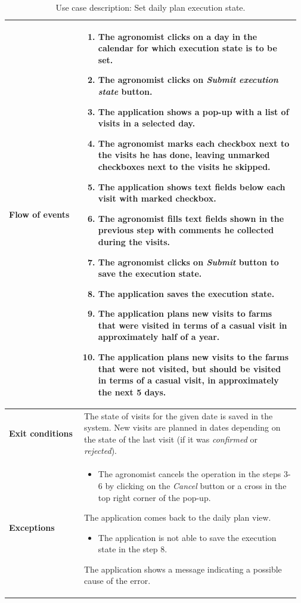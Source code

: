 \begin{table}[H]
\begin{tabular}{@{}p{0.25\linewidth} p{0.72\linewidth}@{}}
		\textbf{Flow of events}     & \begin{enumerate}[leftmargin=.4cm,noitemsep,topsep=0pt,before=\vspace{-3mm},after=\vspace{-4mm}]
		    \item The agronomist clicks on a day in the calendar for which execution state is to be set.
		    \item The agronomist clicks on \textit{Submit execution state} button.
		    \item The application shows a pop-up with a list of visits in a selected day.
		    \item The agronomist marks each checkbox next to the visits he has done, leaving unmarked checkboxes next to the visits he skipped.
		    \item The application shows text fields below each visit with marked checkbox.
		    \item The agronomist fills text fields shown in the previous step with comments he collected during the visits.
		    \item The agronomist clicks on \textit{Submit} button to save the execution state.
		    \item The application saves the execution state.
		    \item The application plans new visits to farms that were visited in terms of a casual visit in approximately half of a year.
		    \item The application plans new visits to the farms that were not visited, but should be visited in terms of a casual visit, in approximately the next 5 days.
		\end{enumerate}\\
		\midrule
		\textbf{Exit conditions}    & The state of visits for the given date is saved in the system. New visits are planned in dates depending on the state of the last visit (if it was \textit{confirmed} or \textit{rejected}). \\
		\midrule
		
		\textbf{Exceptions}         & \begin{itemize}[leftmargin=.4cm,noitemsep,topsep=0pt,before=\vspace{-3mm}]
		   \item The agronomist cancels the operation in the steps 3-6 by clicking on the \textit{Cancel} button or a cross in the top right corner of the pop-up.
		\end{itemize}
		The application comes back to the daily plan view.
	    \begin{itemize}[leftmargin=.4cm,noitemsep,topsep=0pt]
		   \item The application is not able to save the execution state in the step 8. 
		\end{itemize}
		The application shows a message indicating a possible cause of the error.
	    \\\bottomrule
	\end{tabular}
	\caption{Use case description: Set daily plan execution state.} 
\end{table}

